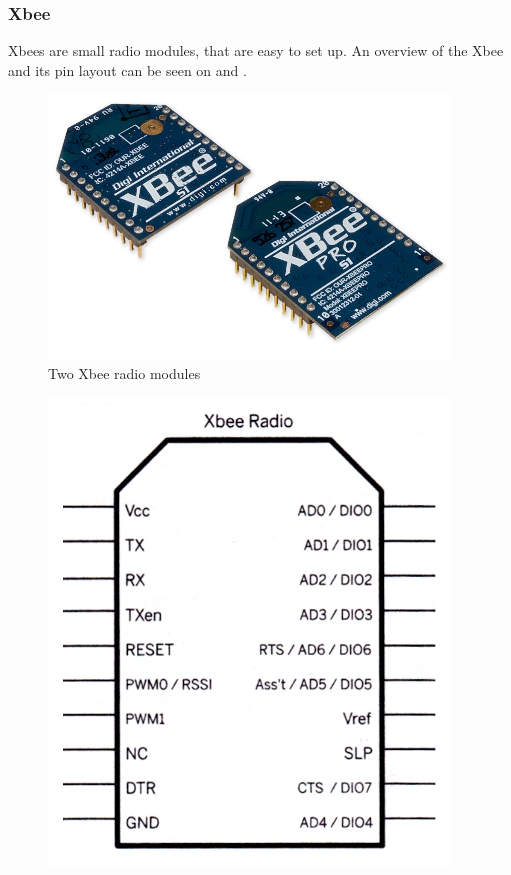 \subsubsection{Xbee}\label{Xbee}
Xbees are small radio modules, that are easy to set up. An overview of the Xbee and its pin layout can be seen on  and .


\begin{minipage}{\linewidth}
	\centering
	\begin{minipage}{0.45\linewidth}      
		\begin{figure}[H]
			\centering
			\includegraphics[width=0.95\textwidth]{figures/Xbee.jpg}
			\caption{Two Xbee radio modules\cite{Digi} } 
			\label{XbeeLook}
		\end{figure}\vspace{-5mm}
	\end{minipage}
	\hspace{0.03\linewidth}
	\begin{minipage}{0.45\linewidth}
		\begin{figure}[H]
			\centering
			\includegraphics[width=0.95\textwidth]{figures/XbeeIO.jpg}

\end{figure}
\end{minipage}
\end{minipage}

